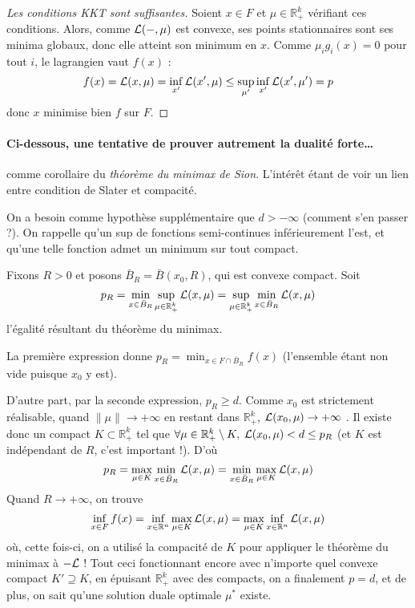\documentclass[a4paper, 11pt]{article}
\def\R{\mathbb{R}}
\def\L{{\cal{L}}}
\begin{document}
\begin{proof}[Les conditions KKT sont suffisantes]
Soient $x \in F$ et $\mu \in \R_+^k$ vérifiant ces conditions. Alors, comme
$\L(-,\mu)$ est convexe, ses points stationnaires sont ses minima globaux, donc
elle atteint son minimum en $x$. Comme $\mu_i g_i(x) = 0$ pour tout $i$, le
lagrangien vaut $f(x)$ :
\[ f(x) = \L(x,\mu) = \inf_{x'} \L(x',\mu) \leq \sup_{\mu'} \inf_{x'}
  \L(x',\mu') = p
\]
donc $x$ minimise bien $f$ sur $F$.
\end{proof}

\paragraph{Ci-dessous, une tentative de prouver autrement la dualité forte…}
comme corollaire du \emph{théorème du minimax de Sion}. L'intérêt étant de voir
un lien entre condition de Slater et compacité.

On a besoin comme hypothèse supplémentaire que $d > -\infty$ (comment s'en
passer ?). On rappelle qu'un sup de fonctions semi-continues inférieurement
l'est, et qu'une telle fonction admet un minimum sur tout compact.

Fixons $R > 0$ et posons $\bar{B}_R = \bar{B}(x_0,R)$, qui est convexe compact.
Soit
\[ p_R = \min_{x \in \bar{B}_R} \sup_{\mu \in \R_+^k} \L(x,\mu)
       = \sup_{\mu \in \R_+^k} \min_{x \in \bar{B}_R} \L(x,\mu) \]
l'égalité résultant du théorème du minimax.

La première expression donne $p_R = \min_{x \in F \cap \bar{B}_R} f(x)$
(l'ensemble étant non vide puisque $x_0$ y est).

D'autre part, par la seconde expression, $p_R \geq d$. Comme $x_0$ est
strictement réalisable, quand $\|\mu\| \to +\infty$ en restant dans $\R_+^k$,
$\L(x_0, \mu) \to +\infty$ . Il existe donc un compact $K \subset \R_+^k$ tel
que $\forall \mu \in \R_+^k \setminus K,\; \L(x_0, \mu) < d \leq p_R$ (et $K$
est indépendant de $R$, c'est important !). D'où
\[ p_R = \max_{\mu \in K} \min_{x \in \bar{B}_R} \L(x,\mu) =
  \min_{x \in \bar{B}_R} \max_{\mu \in K} \L(x,\mu) \]
Quand $R \to +\infty$, on trouve
\[ \inf_{x \in F} f(x) = \inf_{x \in \R^n} \max_{\mu \in K} \L(x,\mu) 
  = \max_{\mu \in K} \inf_{x \in \R^n} \L(x,\mu)  \]
où, cette fois-ci, on a utilisé la compacité de $K$ pour appliquer le théorème
du minimax à $-\L$ ! Tout ceci fonctionnant encore avec n'importe quel convexe
compact $K' \supseteq K$, en épuisant $\R_+^k$ avec des compacts, on a
finalement $p = d$, et de plus, on sait qu'une solution duale optimale $\mu^*$
existe.
\end{document}
